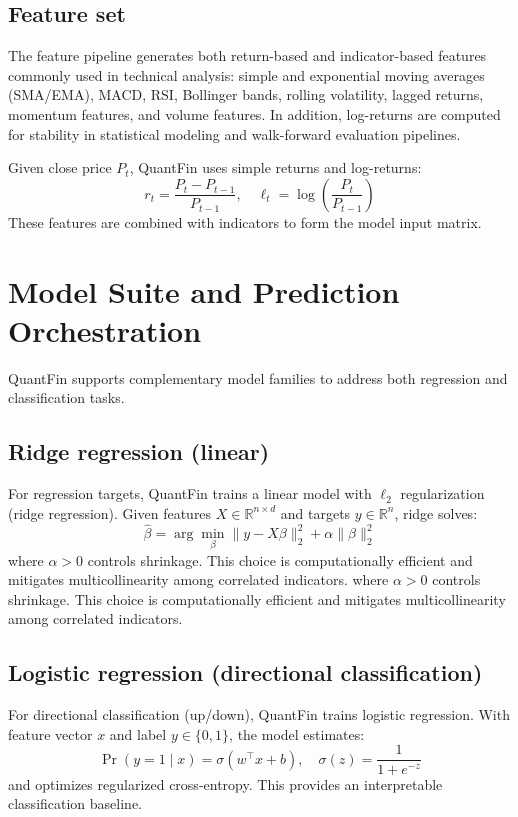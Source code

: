 \documentclass[conference]{IEEEtran}
\begin{document}
\subsection{Feature set}
The feature pipeline generates both return-based and indicator-based features commonly used in technical analysis:
simple and exponential moving averages (SMA/EMA), MACD, RSI, Bollinger bands, rolling volatility, lagged returns, momentum features, and volume features. In addition, log-returns are computed for stability in statistical modeling and walk-forward evaluation pipelines.

Given close price $P_t$, QuantFin uses simple returns and log-returns:
\begin{equation}
r_t = \frac{P_t - P_{t-1}}{P_{t-1}},\quad \ell_t = \log\left(\frac{P_t}{P_{t-1}}\right)
\end{equation}
These features are combined with indicators to form the model input matrix.

\section{Model Suite and Prediction Orchestration}\label{sec:models}
QuantFin supports complementary model families to address both regression and classification tasks.

\subsection{Ridge regression (linear)}
For regression targets, QuantFin trains a linear model with $\ell_2$ regularization (ridge regression). Given features $X \in \mathbb{R}^{n\times d}$ and targets $y \in \mathbb{R}^n$, ridge solves:
\begin{equation}
\hat{\beta} = \arg\min_{\beta} \|y - X\beta\|_2^2 + \alpha\|\beta\|_2^2
\end{equation}
where $\alpha > 0$ controls shrinkage. This choice is computationally efficient and mitigates multicollinearity among correlated indicators.
where $\alpha > 0$ controls shrinkage. This choice is computationally efficient and mitigates multicollinearity among correlated indicators.

\subsection{Logistic regression (directional classification)}
For directional classification (up/down), QuantFin trains logistic regression. With feature vector $x$ and label $y\in\{0,1\}$, the model estimates:
\begin{equation}
\Pr(y=1\mid x)=\sigma(w^\top x+b),\quad \sigma(z)=\frac{1}{1+e^{-z}}
\end{equation}
and optimizes regularized cross-entropy. This provides an interpretable classification baseline.
\end{document}
